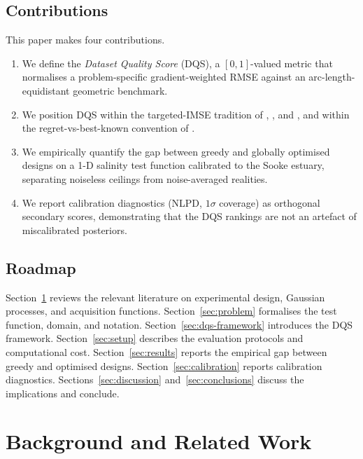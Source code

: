 \documentclass[11pt,letterpaper]{article}
\begin{document}
\subsection{Contributions}
This paper makes four contributions.
\begin{enumerate}[itemsep=2pt,topsep=2pt]
  \item We define the \emph{Dataset Quality Score} (DQS), a
        $[0,1]$-valued metric that normalises a problem-specific
        gradient-weighted RMSE against an arc-length-equidistant
        geometric benchmark.
  \item We position DQS within the targeted-IMSE tradition of
        \citet{williams2000sequential}, \citet{picheny2010adaptive},
        and \citet{bect2012sequential}, and within the
        regret-vs-best-known convention of \citet{frazier2018tutorial}.
  \item We empirically quantify the gap between greedy and globally
        optimised designs on a 1-D salinity test function calibrated to
        the Sooke estuary, separating noiseless ceilings from
        noise-averaged realities.
  \item We report calibration diagnostics (NLPD, $1\sigma$ coverage)
        as orthogonal secondary scores, demonstrating that the DQS
        rankings are not an artefact of miscalibrated posteriors.
\end{enumerate}

\subsection{Roadmap}
Section~\ref{sec:related} reviews the relevant literature on
experimental design, Gaussian processes, and acquisition functions.
Section~\ref{sec:problem} formalises the test function, domain, and
notation. Section~\ref{sec:dqs-framework} introduces the DQS framework.
Section~\ref{sec:setup} describes the evaluation protocols and
computational cost. Section~\ref{sec:results} reports the empirical
gap between greedy and optimised designs. Section~\ref{sec:calibration}
reports calibration diagnostics. Sections~\ref{sec:discussion}
and~\ref{sec:conclusions} discuss the implications and conclude.

\section{Background and Related Work}
\label{sec:related}
\end{document}
